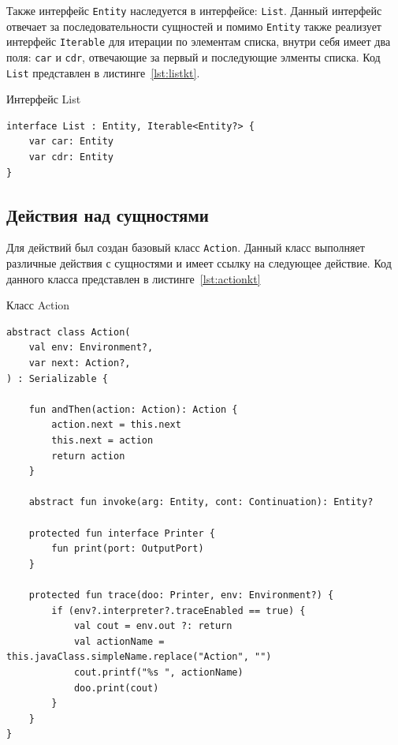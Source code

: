 \documentclass[14pt, russian]{scrartcl}
\begin{document}
Также интерфейс \texttt{Entity} наследуется в интерфейсе: \texttt{List}.
Данный интерфейс отвечает за последовательности сущностей и помимо \texttt{Entity} также реализует интерфейс \texttt{Iterable} для итерации по элементам списка, внутри себя имеет два поля: \texttt{car} и \texttt{cdr}, отвечающие за первый и последующие элменты списка.
Код \texttt{List} представлен в листинге~\ref{lst:listkt}.

\begin{listing}[!htb]
\caption{Интерфейс List}
\label{lst:listkt}
\begin{verbatim}
interface List : Entity, Iterable<Entity?> {
    var car: Entity
    var cdr: Entity
}
\end{verbatim}
\end{listing}

\subsection{Действия над сущностями}

Для действий был создан базовый класс \texttt{Action}.
Данный класс выполняет различные действия с сущностями и имеет ссылку на следующее действие.
Код данного класса представлен в листинге~\ref{lst:actionkt}

\begin{listing}[!htb]
\caption{Класс Action}
\label{lst:actionkt}
\begin{verbatim}
abstract class Action(
    val env: Environment?,
    var next: Action?,
) : Serializable {

    fun andThen(action: Action): Action {
        action.next = this.next
        this.next = action
        return action
    }

    abstract fun invoke(arg: Entity, cont: Continuation): Entity?

    protected fun interface Printer {
        fun print(port: OutputPort)
    }

    protected fun trace(doo: Printer, env: Environment?) {
        if (env?.interpreter?.traceEnabled == true) {
            val cout = env.out ?: return
            val actionName = this.javaClass.simpleName.replace("Action", "")
            cout.printf("%s ", actionName)
            doo.print(cout)
        }
    }
}

\end{verbatim}
\end{listing}
\end{document}
